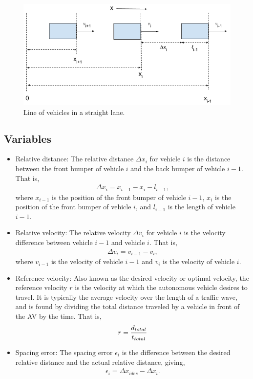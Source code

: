 \documentclass[conference]{IEEEtran}
\begin{document}
\begin{figure}[htbp]
\centerline{\includegraphics[width=3.75 in]{carLane.png}}
\caption{Line of vehicles in a straight lane.}
\label{fig1}
\end{figure}

\subsection{Variables}
\begin{itemize}
\item Relative distance: The relative distance $\Delta x_i$ for vehicle $i$ is the distance between the front bumper of vehicle $i$ and the back bumper of vehicle $i-1$. That is,
\begin{eqnarray}
\Delta x_i = x_{i-1}-x_i-l_{i-1},
\end{eqnarray}
where $x_{i-1}$ is the position of the front bumper of vehicle $i-1$, $x_i$ is the position of the front bumper of vehicle $i$, and $l_{i-1}$ is the length of vehicle $i-1$.
\item Relative velocity: The relative velocity $\Delta v_i$ for vehicle $i$ is the velocity difference between vehicle $i-1$ and vehicle $i$. That is,
\begin{eqnarray}
\Delta v_i=v_{i-1}-v_i,
\end{eqnarray}
where $v_{i-1}$ is the velocity of vehicle $i-1$ and $v_i$ is the velocity of vehicle $i$.
\item Reference velocity: Also known as the desired velocity or optimal velocity, the reference velocity $r$ is the velocity at which the autonomous vehicle desires to travel. It is typically the average velocity over the length of a traffic wave, and is found by dividing the total distance traveled by a vehicle in front of the AV by the time. That is,
\begin{eqnarray}
r={d_{total}\over t_{total}}
\end{eqnarray}
\item Spacing error: The spacing error $\epsilon_i$ is the difference between the desired relative distance and the actual relative distance, giving,
\begin{eqnarray}
\epsilon_i = \Delta x_{i des}-\Delta x_i.
\end{eqnarray}
\end{itemize}
\end{document}
